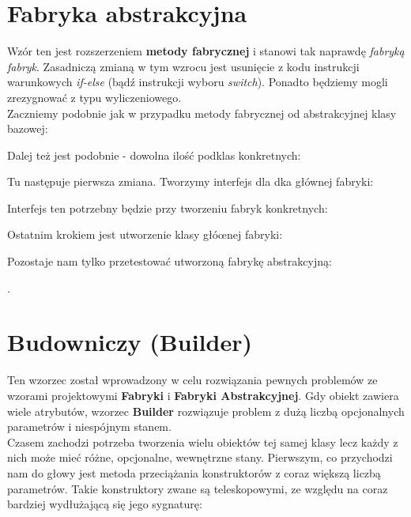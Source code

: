 \documentclass[12pt,a4paper]{article}
\begin{document}
	\section{Fabryka abstrakcyjna}
	Wzór ten jest rozszerzeniem \textbf{metody fabrycznej} i stanowi tak naprawdę \textit{fabryką fabryk}. Zasadniczą zmianą w tym wzrocu jest usunięcie z kodu instrukcji warunkowych \textit{if-else} (bądź instrukcji wyboru \textit{switch}).  Ponadto będziemy mogli zrezygnować z typu wyliczeniowego.\\
	Zaczniemy podobnie jak w przypadku metody fabrycznej od abstrakcyjnej klasy bazowej:
	
	Dalej też jest podobnie - dowolna ilość podklas konkretnych:
	
	
	Tu następuje pierwsza zmiana. Tworzymy interfejs dla dka głównej fabryki:
	
	Interfejs ten potrzebny będzie przy tworzeniu fabryk konkretnych:
	
	
	Ostatnim krokiem jest utworzenie klasy głóœnej fabryki:
	
	Pozostaje nam tylko przetestować utworzoną fabrykę abstrakcyjną:
	
	\cite{PankajKumar}.
    \section{Budowniczy (Builder)}
    Ten wzorzec został wprowadzony w celu rozwiązania pewnych problemów ze wzorami projektowymi \textbf{Fabryki} i \textbf{Fabryki Abstrakcyjnej}. Gdy obiekt zawiera wiele atrybutów, wzorzec \textbf{Builder} rozwiązuje problem z dużą liczbą opcjonalnych parametrów i niespójnym stanem\cite{PankajKumar}.\\
    Czasem zachodzi potrzeba tworzenia wielu obiektów tej samej klasy lecz każdy z nich może mieć różne, opcjonalne, wewnętrzne stany. Pierwszym, co przychodzi nam do głowy jest metoda przeciążania konstruktorów z coraz większą liczbą parametrów. Takie konstruktory zwane są teleskopowymi, ze względu na coraz bardziej wydłużającą się jego sygnaturę:\\
\end{document}
